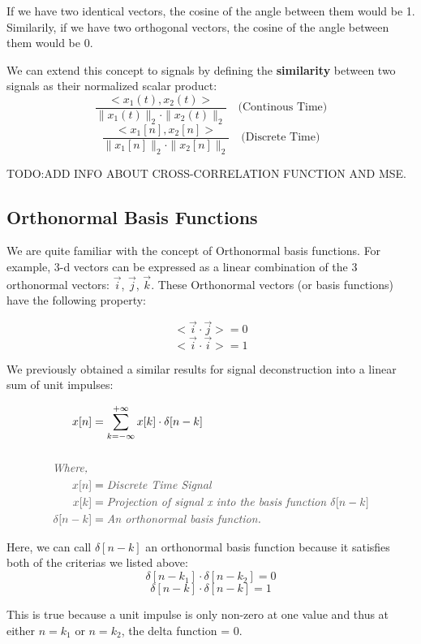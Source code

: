 \documentclass[letterpaper,12pt]{article}
\newcommand{\annot}[1]{\textcolor{darkgray}{\textit{#1}}}
\begin{document}
If we have two identical vectors, the cosine of the angle between them would be 1. Similarily, if we have two orthogonal vectors, the cosine of the angle between them would be 0.

We can extend this concept to signals by defining the \textbf{similarity} between two signals as their normalized scalar product:
\[\frac{<x_1(t), x_2(t)>}{\| x_1(t) \|_2 \cdot \| x_2(t) \|_2}\quad \text{(Continous Time)}\]
\[\frac{<x_1[n], x_2[n]>}{\| x_1[n] \|_2 \cdot \| x_2[n] \|_2}\quad \text{(Discrete Time)}\]

TODO:ADD INFO ABOUT CROSS-CORRELATION FUNCTION AND MSE.

\subsection*{Orthonormal Basis Functions}
We are quite familiar with the concept of Orthonormal basis functions. For example, 3-d vectors can be expressed as a linear combination of the 3 orthonormal vectors: $\Vec{i}$, $\Vec{j}$, $\Vec{k}$.
These Orthonormal vectors (or basis functions) have the following property:

\[<\Vec{i} \cdot \Vec{j}> = 0\]
\[<\Vec{i} \cdot \Vec{i}> = 1\]

We previously obtained a similar results for signal deconstruction into a linear sum of unit impulses:

\begin{align*}
    x[n]                  & = \sum_{k=-\infty}^{+\infty} x[k] \cdot \delta [n-k]                   \\ \\
    \annot{Where, }                                                                                \\
    \annot{$x[n]$}        & = \annot{Discrete Time Signal}                                         \\
    \annot{$x[k]$}        & = \annot{Projection of signal x into the basis function $\delta[n-k]$} \\
    \annot{$\delta[n-k]$} & = \annot{An orthonormal basis function.}
\end{align*}

Here, we can call $\delta[n-k]$ an orthonormal basis function because it satisfies both of the criterias we listed above:
\[\delta[n-k_{1}] \cdot \delta[n-k_{2}] = 0\]
\[\delta[n-k] \cdot \delta[n-k] = 1\]

This is true because a unit impulse is only non-zero at one value and thus at either $n=k_{1}$ or $n=k_{2}$, the delta function = 0.
\end{document}
